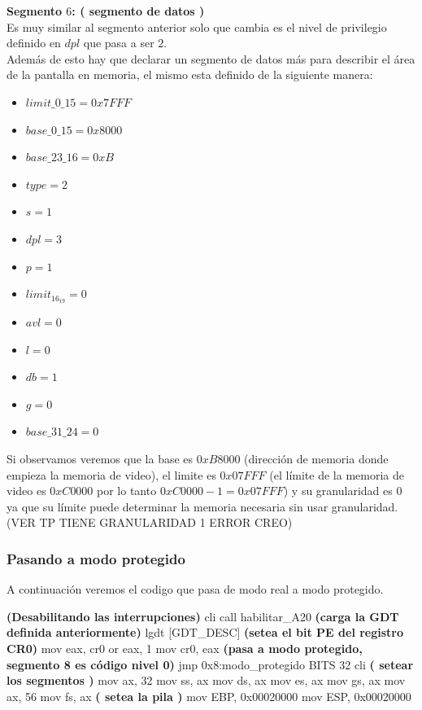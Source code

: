 \documentclass[a4paper,10pt,twoside]{article}
\newenvironment{pseudocodigo}
    {\vspace{0.5em} \begin{algorithmic}}
    {\end{algorithmic} \vspace{0.5em}}
\begin{document}
\textbf{Segmento $6$: ( segmento de datos )} \\
Es muy similar al segmento anterior solo que cambia es el nivel de privilegio definido en $dpl$ que pasa a ser $2$. \\ 

Además de esto hay que declarar un segmento de datos más para describir el área de la pantalla en memoria, el mismo esta definido de la siguiente manera: 
\begin{itemize}
 \item $limit\_0\_15 = 0x7FFF$
 \item $base\_0\_15 = 0x8000$ 
 \item $base\_23\_16 = 0xB$
 \item $type = 2$
 \item $s = 1$
 \item $dpl = 3$
 \item $p = 1$
 \item $limit_16_19 = 0$
 \item $avl = 0$
 \item $l = 0$
 \item $db = 1$
 \item $g = 0$
 \item $base\_31\_24  = 0$
\end{itemize}

Si observamos veremos que la base es $0xB8000$ (dirección de memoria donde empieza la memoria de video), el limite es $0x07FFF$ (el límite de la memoria de video es $0xC0000$ por lo tanto $0xC0000-1 = 0x07FFF$) y su granularidad es 0 ya que su límite puede determinar la memoria necesaria sin usar granularidad. (VER TP TIENE GRANULARIDAD 1 ERROR CREO)

\subsubsection{Pasando a modo protegido}

A continuación veremos el codigo que pasa de modo real a modo protegido.

\begin{pseudocodigo}
  \STATE
  \STATE \textbf{(Desabilitando las interrupciones)}
  \STATE cli
  \STATE
  \STATE call habilitar\_A20
  \STATE
  \STATE \textbf{(carga la GDT definida anteriormente)}
  \STATE lgdt [GDT\_DESC]
  \STATE
  \STATE \textbf{(setea el bit PE del registro CR0)}
  \STATE mov eax, cr0
  \STATE or eax, 1
  \STATE mov cr0, eax
  \STATE
  \STATE \textbf{(pasa a modo protegido, segmento 8 es código nivel 0)}
  \STATE jmp 0x8:modo\_protegido
  \STATE BITS 32
  \STATE cli
  \STATE 
  \STATE \textbf{( setear los segmentos )}
  \STATE mov ax, 32
  \STATE mov ss, ax
  \STATE mov ds, ax
  \STATE mov es, ax
  \STATE mov gs, ax
  \STATE mov ax, 56
  \STATE mov fs, ax
  \STATE 
  \STATE \textbf{( setea la pila )}
  \STATE mov EBP, 0x00020000	
  \STATE mov ESP, 0x00020000
\end{pseudocodigo}
\end{document}
